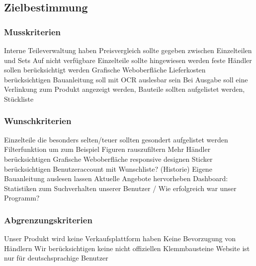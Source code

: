 \subsection{Zielbestimmung}

\subsubsection{Musskriterien}
Interne Teileverwaltung haben \newline
Preisvergleich sollte gegeben zwischen Einzelteilen und Sets \newline
Auf nicht verfügbare Einzelteile sollte hingewiesen werden  feste Händler sollen berücksichtigt werden \newline
Grafische Weboberfläche \newline
Lieferkosten berücksichtigen \newline
Bauanleitung soll mit OCR auslesbar sein \newline
Bei Ausgabe soll eine Verlinkung zum Produkt angezeigt werden, Bauteile sollten aufgelistet werden, Stückliste \newline

\subsubsection{Wunschkriterien}
Einzelteile die besonders selten/teuer sollten gesondert aufgelistet werden \newline
Filterfunktion um zum Beispiel Figuren rauszufiltern \newline
Mehr Händler berücksichtigen \newline
Grafische Weboberfläche responsive designen \newline
Sticker berücksichtigen \newline
Benutzeraccount mit Wunschliste? (Historie) \newline
Eigene Bauanleitung auslesen lassen \newline
Aktuelle Angebote hervorheben \newline
Dashboard: Statistiken zum Suchverhalten unserer Benutzer / Wie erfolgreich war unser Programm? \newline

\subsubsection{Abgrenzungskriterien}
Unser Produkt wird keine Verkaufsplattform haben  \newline
Keine Bevorzugung von Händlern \newline
Wir berücksichtigen keine nicht offiziellen Klemmbausteine \newline
Website ist nur für deutschsprachige Benutzer \newline

